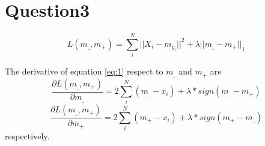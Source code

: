 \documentclass[a4paper,10pt]{article}
\begin{document}
\section{Question3}
    \begin{equation}\label{eq:1}
        L(m_\_,m_{+}) = \sum_{i}^{N}||X_i-m_{y_i}||^2+ \lambda||m_\_-m_+||_1
    \end{equation}

The derivative of equation \ref{eq:1} respect to $m_\_$ and $m_+$ are 
    \begin{equation}
        \frac{\partial L(m_\_,m_+)}{\partial m_\_}=2\sum_{i}^{N}(m_\_-x_i) +\lambda*sign(m_\_-m_+)
    \end{equation}
       \begin{equation}
        \frac{\partial L(m_\_,m_+)}{\partial m_+}=2\sum_{i}^{N}(m_+-x_i) +\lambda*sign(m_+-m_\_)
    \end{equation} 
    respectively.
\end{document}
